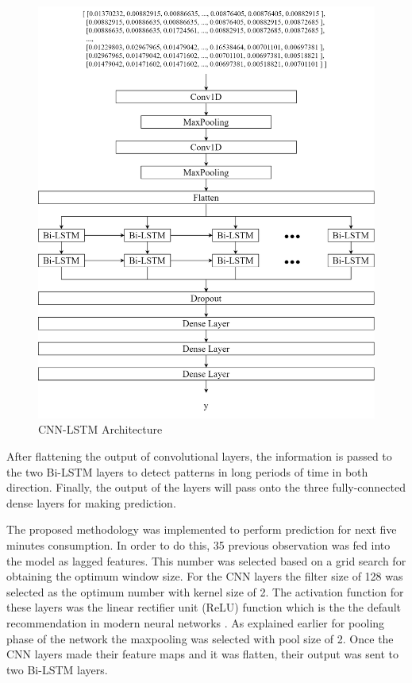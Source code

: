 \documentclass[twocolumn, a4paper,10pt]{article}
\begin{document}
\begin{figure}[ht]
    \centering
    \includegraphics[scale=0.15]{img/architecture.png}
    \caption{CNN-LSTM Architecture}
    \label{fig:CNN-LSTM}
\end{figure}

After flattening the output of convolutional layers, the information is passed to the two Bi-LSTM layers to detect patterns in long periods of time in both direction. Finally, the output of the layers will pass onto the three fully-connected dense layers for making prediction.

The proposed methodology was implemented to perform prediction for next five minutes consumption. In order to do this, 35 previous observation was fed into the model as lagged features. This number was selected based on a grid search for obtaining the optimum window size. For the CNN layers the filter size of 128 was selected as the optimum number with kernel size of 2. The activation function for these layers was the linear rectifier unit (ReLU) function which is the the default recommendation in modern neural networks \citep{RN1282}. As explained earlier for pooling phase of the network the maxpooling was selected with pool size of 2. Once the CNN layers made their feature maps and it was flatten, their output was sent to two Bi-LSTM layers.
\end{document}
